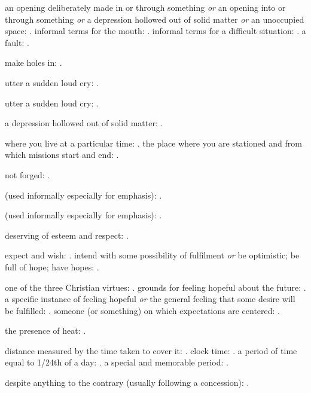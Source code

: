   an opening deliberately made in or through something \textit{or} an opening into or through something \textit{or} a depression hollowed out of solid matter \textit{or} an unoccupied space: . informal terms for the mouth: . informal terms for a difficult situation: . a fault: .

  make holes in: .

  utter a sudden loud cry: .

  utter a sudden loud cry: .

  a depression hollowed out of solid matter: .

  where you live at a particular time: . the place where you are stationed and from which missions start and end: .

  not forged: .

  (used informally especially for emphasis): .

  (used informally especially for emphasis): .

  deserving of esteem and respect: .

  expect and wish: . intend with some possibility of fulfilment \textit{or} be optimistic; be full of hope; have hopes: .

  one of the three Christian virtues: . grounds for feeling hopeful about the future: . a specific instance of feeling hopeful \textit{or} the general feeling that some desire will be fulfilled: . someone (or something) on which expectations are centered: .

  the presence of heat: .

  distance measured by the time taken to cover it: . clock time: . a period of time equal to 1/24th of a day: . a special and memorable period: .

  despite anything to the contrary (usually following a concession): .

